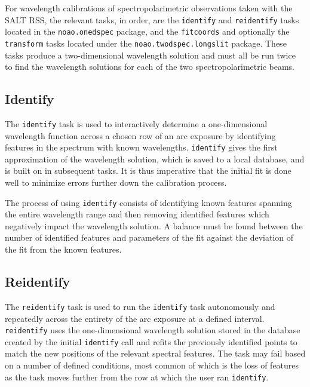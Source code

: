 For wavelength calibrations of spectropolarimetric observations taken with the \gls{SALT} \gls{RSS}, the relevant tasks, in order, are the \texttt{identify} and \texttt{reidentify} tasks located in the \texttt{noao.onedspec} package, and the \texttt{fitcoords} and optionally the \texttt{transform} tasks located under the \texttt{noao.twodspec.longslit} package. These tasks produce a two-dimensional wavelength solution and must all be run twice to find the wavelength solutions for each of the two spectropolarimetric beams.

\subsection{Identify}

The \texttt{identify} task is used to interactively determine a one-dimensional wavelength function across a chosen row of an arc exposure by identifying features in the spectrum with known wavelengths. \texttt{identify} gives the first approximation of the wavelength solution, which is saved to a local database, and is built on in subsequent tasks. It is thus imperative that the initial fit is done well to minimize errors further down the calibration process.

The process of using \texttt{identify} consists of identifying known features spanning the entire wavelength range and then removing identified features which negatively impact the wavelength solution. A balance must be found between the number of identified features and parameters of the fit against the deviation of the fit from the known features. %

\subsection{Reidentify}

The \texttt{reidentify} task is used to run the \texttt{identify} task autonomously and repeatedly across the entirety of the arc exposure at a defined interval. \texttt{reidentify} uses the one-dimensional wavelength solution stored in the database created by the initial \texttt{identify} call and refits the previously identified points to match the new positions of the relevant spectral features. The task may fail based on a number of defined conditions, most common of which is the loss of features as the task moves further from the row at which the user ran \texttt{identify}.

